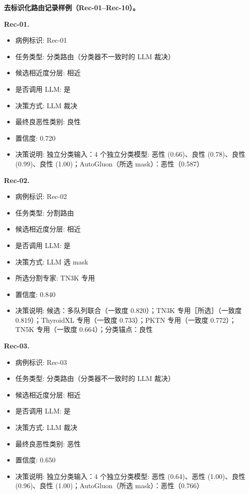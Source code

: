 \noindent\textbf{去标识化路由记录样例（Rec-01--Rec-10）。}
\label{sec_A1_routing_exemplars}
\par\smallskip
\noindent\textbf{Rec-01.}\par
\begin{itemize}[leftmargin=1.5em,topsep=0.1em,itemsep=0.05em]
\item 病例标识: Rec-01
\item 任务类型: 分类路由（分类器不一致时的 LLM 裁决）
\item 候选相近度分层: 相近
\item 是否调用 LLM: 是
\item 决策方式: LLM 裁决
\item 最终良恶性类别: 良性
\item 置信度: 0.720
\item 决策说明: 独立分类输入：4 个独立分类模型: 恶性 (0.66)、良性 (0.78)、良性 (0.99)、良性 (1.00)；AutoGluon（所选 mask）：恶性（0.587）
\end{itemize}
\noindent\textbf{Rec-02.}\par
\begin{itemize}[leftmargin=1.5em,topsep=0.1em,itemsep=0.05em]
\item 病例标识: Rec-02
\item 任务类型: 分割路由
\item 候选相近度分层: 相近
\item 是否调用 LLM: 是
\item 决策方式: LLM 选 mask
\item 所选分割专家: TN3K 专用
\item 置信度: 0.840
\item 决策说明: 候选：多队列联合（一致度 0.820）；TN3K 专用［所选］（一致度 0.819）；ThyroidXL 专用（一致度 0.733）；PKTN 专用（一致度 0.772）；TN5K 专用（一致度 0.664）；分类锚点：良性
\end{itemize}
\noindent\textbf{Rec-03.}\par
\begin{itemize}[leftmargin=1.5em,topsep=0.1em,itemsep=0.05em]
\item 病例标识: Rec-03
\item 任务类型: 分类路由（分类器不一致时的 LLM 裁决）
\item 候选相近度分层: 相近
\item 是否调用 LLM: 是
\item 决策方式: LLM 裁决
\item 最终良恶性类别: 恶性
\item 置信度: 0.650
\item 决策说明: 独立分类输入：4 个独立分类模型: 恶性 (0.64)、恶性 (1.00)、良性 (0.96)、良性 (1.00)；AutoGluon（所选 mask）：恶性（0.766）
\end{itemize}
